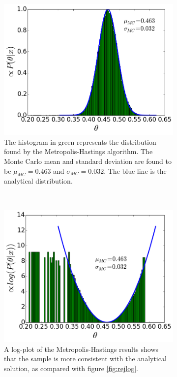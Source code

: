 \documentclass[a4paper,11pt,twoside]{article}
\begin{document}
\begin{figure}[ht]
	\centering
	\begin{subfigure}[t]{0.4\textwidth}
		\centering
		\includegraphics[width=\textwidth]{metropolishastings.png}
		\caption{The histogram in green represents the distribution
			found by the Metropolis-Hastings algorithm. The Monte Carlo mean and standard
			deviation are found to be $\mu_{MC} = 0.463$ and $\sigma_{MC} = 0.032$.
			The blue line is the analytical distribution.}
		\label{fig:metropolis}
	\end{subfigure}
	~
	\begin{subfigure}[t]{0.4\textwidth}
		\centering
		\includegraphics[width=\textwidth]{mhlog.png}
		\caption{A log-plot of the Metropolis-Hastings results shows
		that the sample is more consistent with the analytical solution,
	as compared with figure \ref{fig:rejlog}.}
		\label{fig:mhlog}
	\end{subfigure}
	\caption{}\label{fig:mh}
\end{figure}
\end{document}
